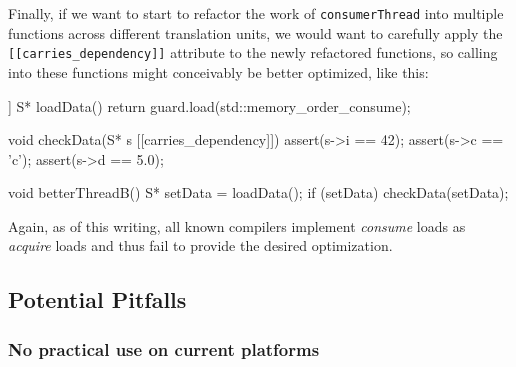 \noindent Finally, if we want to start to refactor the work of
\lstinline!consumerThread! into multiple\linebreak%
 functions across different
translation units, we would want to carefully apply the\linebreak%
\lstinline![[carries_dependency]]! attribute to the newly refactored
functions, so calling into these functions might conceivably be better
optimized, like this:

\begin{emcppslisting}[emcppsbatch=e1]
[[carries_dependency]] S* loadData()
{
    return guard.load(std::memory_order_consume);
}

void checkData(S* s [[carries_dependency]])
{
    assert(s->i == 42);
    assert(s->c == 'c');
    assert(s->d == 5.0);
}

void betterThreadB()
{
    S* setData = loadData();
    if (setData)
    {
        checkData(setData);
    }
}
\end{emcppslisting}
    
\noindent Again, as of this writing, all known compilers implement \emph{consume}
loads as \emph{acquire} loads and thus fail to provide the desired
optimization.

\subsection[Potential Pitfalls]{Potential Pitfalls}\label{potential-pitfalls}

\subsubsection[No practical use on current platforms]{No practical use on current platforms}\label{no-practical-use-on-current-platforms}

